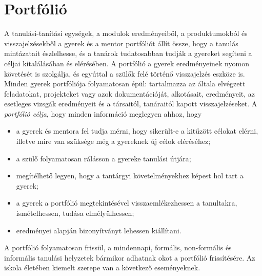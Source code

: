 \section{Portfólió}
\label{sec:portfolio}
A tanulási-tanítási egységek, a modulok eredményeiből, a produktumokból és visszajelzésekből a gyerek és a mentor portfóliót állít össze, hogy a tanulás mintázatait észlelhesse, és a tanárok tudatosabban tudják a gyereket segíteni a céljai kitalálásában és elérésében. A portfólió a gyerek eredményeinek nyomon követését is szolgálja, és egyúttal a szülők felé történő visszajelzés eszköze is. Minden gyerek portfóliója folyamatosan épül: tartalmazza az általa elvégzett feladatokat, projekteket vagy azok dokumentációját, alkotásait, eredményeit, az esetleges vizsgák eredményeit és a társaitól, tanáraitól kapott visszajelzéseket. A \emph{portfólió célja}, hogy minden információ meglegyen ahhoz, hogy

\begin{itemize}
      \item a gyerek és mentora fel tudja mérni, hogy sikerült-e a kitűzött célokat elérni, illetve mire van szüksége még a gyereknek új célok eléréséhez;

      \item a szülő folyamatosan rálásson a gyereke tanulási útjára;

      \item megítélhető legyen, hogy a tantárgyi követelményekhez képest hol tart a gyerek;

      \item a gyerek a portfólió megtekintésével visszaemlékezhessen a tanultakra, ismételhessen, tudása elmélyülhessen;

      \item eredményei alapján bizonyítványt lehessen kiállítani.

\end{itemize}

A portfólió folyamatosan frissül, a mindennapi, formális, non-for\-má\-lis és informális tanulási helyzetek bármikor adhatnak okot a portfólió frissítésére. Az iskola életében kiemelt szerepe van a következő eseményeknek.

